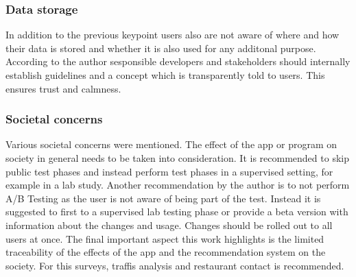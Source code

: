 \documentclass[runningheads,a4paper]{llncs}
\begin{document}
\subsubsection{Data storage}
In addition to the previous keypoint users also are not aware of where and how their data is stored and whether it is also used for any additonal purpose. 
According to the author sesponsible developers and stakeholders should internally establish guidelines and a concept which is transparently told to users. 
This ensures trust and calmness. 
\subsubsection{Societal concerns}
Various societal concerns were mentioned. 
The effect of the app or program on society in general needs to be taken into consideration. 
It is recommended to skip public test phases and instead perform test phases in a supervised setting, for example in a lab study.
Another recommendation by the author is to not perform A/B Testing as the user is not aware of being part of the test. 
Instead it is suggested to first to a supervised lab testing phase or provide a beta version with information about the changes and usage.
Changes should be rolled out to all users at once. 
The final important aspect this work highlights is the limited traceability of the effects of the app and the recommendation system on the society.
For this surveys, traffis analysis and restaurant contact is recommended.\cite{levina2021towards} 
\end{document}
